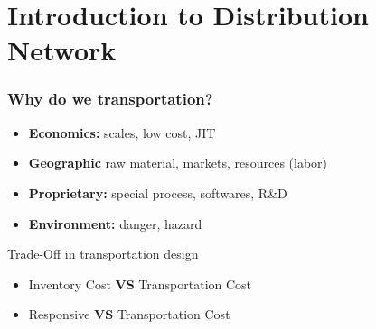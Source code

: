 \documentclass[10pt,handout,notes=show]{beamer}
\begin{document}
\section[Network 101]{Introduction to Distribution Network}
\begin{frame}

  \frametitle{Why do we transportation?}
  \begin{itemize}
    \item \textbf{Economics:} scales, low cost, JIT
    \item \textbf{Geographic} raw material, markets, resources (labor)
    \item \textbf{Proprietary:} special process, softwares, R\&D
    \item \textbf{Environment:} danger, hazard
  \end{itemize}

  \NextLine
  \begin{alertblock}{\small{Trade-Off in transportation design}}{}
    \begin{center}
    \begin{itemize}
      \item Inventory Cost \textbf{VS} Transportation Cost
      \item Responsive \textbf{VS} Transportation Cost
    \end{itemize}
    \end{center}
  \end{alertblock}

 \end{frame}
\end{document}
